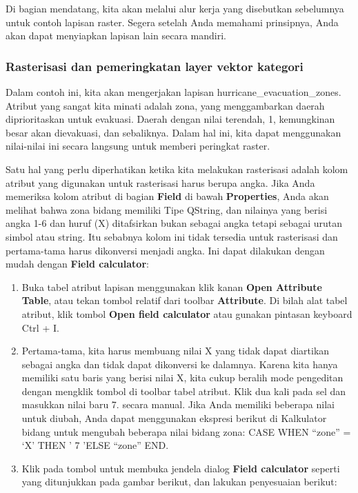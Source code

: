 \documentclass[]{book}
\begin{document}
Di bagian mendatang, kita akan melalui alur kerja yang disebutkan sebelumnya untuk contoh lapisan raster. Segera setelah Anda memahami prinsipnya, Anda akan dapat menyiapkan lapisan lain secara mandiri.

\hypertarget{rasterisasi-dan-pemeringkatan-layer-vektor-kategori}{%
\subsubsection{Rasterisasi dan pemeringkatan layer vektor kategori}\label{rasterisasi-dan-pemeringkatan-layer-vektor-kategori}}

Dalam contoh ini, kita akan mengerjakan lapisan hurricane\_evacuation\_zones. Atribut yang sangat kita minati adalah zona, yang menggambarkan daerah diprioritaskan untuk evakuasi. Daerah dengan nilai terendah, 1, kemungkinan besar akan dievakuasi, dan sebaliknya. Dalam hal ini, kita dapat menggunakan nilai-nilai ini secara langsung untuk memberi peringkat raster.

Satu hal yang perlu diperhatikan ketika kita melakukan rasterisasi adalah kolom atribut yang digunakan untuk rasterisasi harus berupa angka. Jika Anda memeriksa kolom atribut di bagian \textbf{Field} di bawah \textbf{Properties}, Anda akan melihat bahwa zona bidang memiliki Tipe QString, dan nilainya yang berisi angka 1-6 dan huruf (X) ditafsirkan bukan sebagai angka tetapi sebagai urutan simbol atau string. Itu sebabnya kolom ini tidak tersedia untuk rasterisasi dan pertama-tama harus dikonversi menjadi angka. Ini dapat dilakukan dengan mudah dengan \textbf{Field calculator}:

\begin{enumerate}
\def\labelenumi{\arabic{enumi}.}
\item
  Buka tabel atribut lapisan menggunakan klik kanan \textbf{Open Attribute Table}, atau tekan tombol relatif dari toolbar \textbf{Attribute}. Di bilah alat tabel atribut, klik tombol \textbf{Open field calculator} atau gunakan pintasan keyboard Ctrl + I.
\item
  Pertama-tama, kita harus membuang nilai X yang tidak dapat diartikan sebagai angka dan tidak dapat dikonversi ke dalamnya. Karena kita hanya memiliki satu baris yang berisi nilai X, kita cukup beralih mode pengeditan dengan mengklik tombol di toolbar tabel atribut. Klik dua kali pada sel dan masukkan nilai baru 7. secara manual. Jika Anda memiliki beberapa nilai untuk diubah, Anda dapat menggunakan ekspresi berikut di Kalkulator bidang untuk mengubah beberapa nilai bidang zona: CASE WHEN ``zone'' = `X' THEN ' 7 'ELSE ``zone'' END.
\item
  Klik pada tombol untuk membuka jendela dialog \textbf{Field calculator} seperti yang ditunjukkan pada gambar berikut, dan lakukan penyesuaian berikut:
\end{enumerate}
\end{document}
